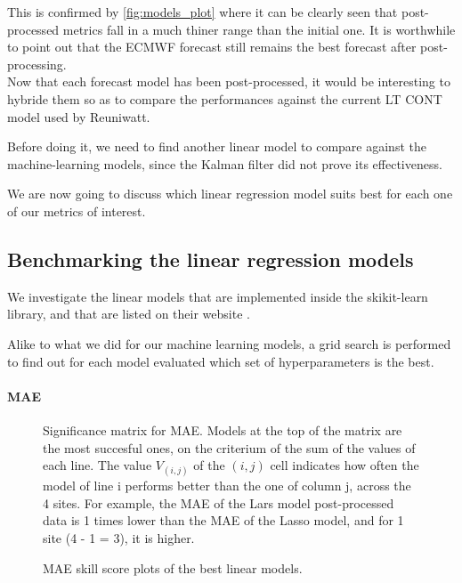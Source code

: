 This is confirmed by \autoref{fig:models_plot} where it can be clearly seen that post-processed metrics fall in a much thiner range than the initial one. It is worthwhile to point out that the ECMWF forecast still remains the best forecast after post-processing.\\

Now that each forecast model has been post-processed, it would be interesting to hybride them so as to compare the performances against the current LT CONT model used by Reuniwatt.

Before doing it, we need to find another linear model to compare against the machine-learning models, since the Kalman filter did not prove its effectiveness.

We are now going to discuss which linear regression model suits best for each one of our metrics of interest.
\subsection{Benchmarking the linear regression models}

We investigate the linear models that are implemented inside the skikit-learn library, and that are listed on their website \cite{sklearnlinear}.

Alike to what we did for our machine learning models, a grid search is performed to find out for each model evaluated which set of hyperparameters is the best.
\paragraph{MAE}\indent

\begin{figure}[htb!]
    \centering
    
\caption{Significance matrix for MAE. Models at the top of the matrix are the most succesful ones, on the criterium of the sum of the values of each line. The value $V_{(i,j)}$ of the $(i,j)$ cell indicates how often the model of line i performs better than the one of column j, across the 
4 sites. For example, the MAE of the Lars model post-processed data is 1 times lower than the MAE of the Lasso model, and for 1 site (4 - 1 = 3), it is higher.}
\label{fig:mat_linear_mae}
\end{figure}

\begin{figure}[htb!]
    \centering
    
\caption{MAE skill score plots of the best linear models.}
\label{fig:ss_linear_mae}
\end{figure}

